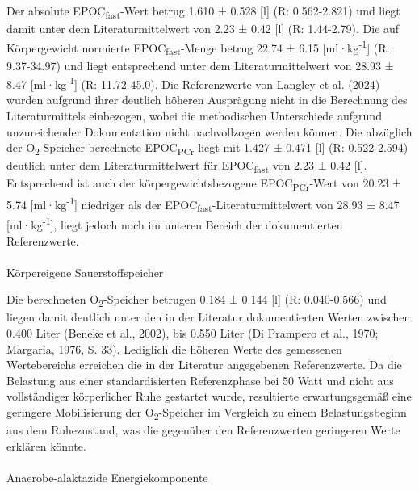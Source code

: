 \documentclass[
  letterpaper,
  DIV=11]{scrartcl}
\makeatletter
\let\oldparagraph\paragraph
\renewcommand{\paragraph}{
    \@ifstar
      \xxxParagraphStar
      \xxxParagraphNoStar
  }
\newcommand{\xxxParagraphStar}[1]{\oldparagraph*{#1}\mbox{}}
\newcommand{\xxxParagraphNoStar}[1]{\oldparagraph{#1}\mbox{}}
\makeatother
\begin{document}
Der absolute EPOC\textsubscript{fast}-Wert betrug 1.610 ± 0.528 {[}l{]}
(R: 0.562-2.821) und liegt damit unter dem Literaturmittelwert von 2.23
± 0.42 {[}l{]} (R: 1.44-2.79). Die auf Körpergewicht normierte
EPOC\textsubscript{fast}-Menge betrug 22.74 ± 6.15
{[}ml·kg\textsuperscript{-1}{]} (R: 9.37-34.97) und liegt entsprechend
unter dem Literaturmittelwert von 28.93 ± 8.47
{[}ml·kg\textsuperscript{-1}{]} (R: 11.72-45.0). Die Referenzwerte von
Langley et al. (2024) wurden aufgrund ihrer deutlich höheren Ausprägung
nicht in die Berechnung des Literaturmittels einbezogen, wobei die
methodischen Unterschiede aufgrund unzureichender Dokumentation nicht
nachvollzogen werden können. Die abzüglich der
O\textsubscript{2}-Speicher berechnete EPOC\textsubscript{PCr} liegt mit
1.427 ± 0.471 {[}l{]} (R: 0.522-2.594) deutlich unter dem
Literaturmittelwert für EPOC\textsubscript{fast} von 2.23 ± 0.42
{[}l{]}. Entsprechend ist auch der körpergewichtsbezogene
EPOC\textsubscript{PCr}-Wert von 20.23 ± 5.74
{[}ml·kg\textsuperscript{-1}{]} niedriger als der
EPOC\textsubscript{fast}-Literaturmittelwert von 28.93 ± 8.47
{[}ml·kg\textsuperscript{-1}{]}, liegt jedoch noch im unteren Bereich
der dokumentierten Referenzwerte.

\paragraph{Körpereigene
Sauerstoffspeicher}\label{kuxf6rpereigene-sauerstoffspeicher}

Die berechneten O\textsubscript{2}-Speicher betrugen 0.184 ± 0.144
{[}l{]} (R: 0.040-0.566) und liegen damit deutlich unter den in der
Literatur dokumentierten Werten zwischen 0.400 Liter (Beneke et al.,
2002), bis 0.550 Liter (Di Prampero et al., 1970; Margaria, 1976, S.
33). Lediglich die höheren Werte des gemessenen Wertebereichs erreichen
die in der Literatur angegebenen Referenzwerte. Da die Belastung aus
einer standardisierten Referenzphase bei 50 Watt und nicht aus
vollständiger körperlicher Ruhe gestartet wurde, resultierte
erwartungsgemäß eine geringere Mobilisierung der
O\textsubscript{2}-Speicher im Vergleich zu einem Belastungsbeginn aus
dem Ruhezustand, was die gegenüber den Referenzwerten geringeren Werte
erklären könnte.

\paragraph{Anaerobe-alaktazide
Energiekomponente}\label{anaerobe-alaktazide-energiekomponente}
\end{document}
